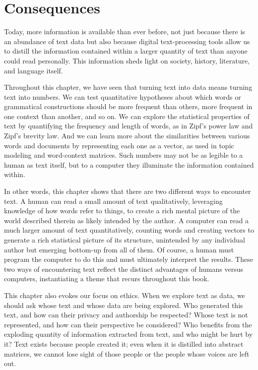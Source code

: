 \section{Consequences}

Today, more information is available than ever before, not just
because there is an abundance of text data but also because digital
text-processing tools allow us to distill the information contained
within a larger quantity of text than anyone could read personally.
This information sheds light on society, history, literature, and
language itself.

Throughout this chapter, we have seen that turning text into data
means turning text into numbers.  We can test quantitative hypotheses
about which words or grammatical constructions should be more frequent
than others, more frequent in one context than another, and so on.  We
can explore the statistical properties of text by quantifying the
frequency and length of words, as in Zipf's power law and Zipf's
brevity law.  And we can learn more about the similarities between
various words and documents by representing each one as a vector, as
used in topic modeling and word-context matrices.  Such numbers may
not be as legible to a human as text itself, but to a computer they
illuminate the information contained within.

In other words, this chapter shows that there are two different ways
to encounter text.  A human can read a small amount of text
qualitatively, leveraging knowledge of how words refer to things, to
create a rich mental picture of the world described therein as likely
intended by the author.  A computer can read a much larger amount of
text quantitatively, counting words and creating vectors to generate a
rich statistical picture of its structure, unintended by any
individual author but emerging bottom-up from all of them.  Of course,
a human must program the computer to do this and must ultimately
interpret the results.  These two ways of encountering text reflect
the distinct advantages of humans versus computers, instantiating a
theme that recurs throughout this book.


This chapter also evokes our focus on ethics.  When we explore text as
data, we should ask whose text and whose data are being explored. Who
generated this text, and how can their privacy and authorship be
respected?  Whose text is not represented, and how can their
perspective be considered?  Who benefits from the exploding quantity
of information extracted from text, and who might be hurt by it?  Text
exists because people created it; even when it is distilled into
abstract matrices, we cannot lose sight of those people or the people
whose voices are left out.


